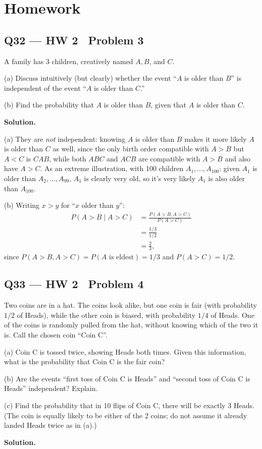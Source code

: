 \documentclass[11pt]{article}
\begin{document}
\section{Homework}

\subsection*{Q32 --- HW 2 \textperiodcentered\ Problem 3}
\begin{qbox}
A family has 3 children, creatively named $A, B$, and $C$.

(a) Discuss intuitively (but clearly) whether the event ``$A$ is older than $B$'' is independent of the event ``$A$ is older than $C$.''

(b) Find the probability that $A$ is older than $B$, given that $A$ is older than $C$.
\end{qbox}
\textbf{Solution.}

(a) They are \emph{not} independent: knowing $A$ is older than $B$ makes it more likely $A$ is older than $C$ as well, since the only birth order compatible with $A>B$ but $A<C$ is $CAB$, while both $ABC$ and $ACB$ are compatible with $A>B$ and also have $A>C$. As an extreme illustration, with 100 children $A_1,\dots,A_{100}$: given $A_1$ is older than $A_2,\dots,A_{99}$, $A_1$ is clearly very old, so it's very likely $A_1$ is also older than $A_{100}$.

(b) Writing $x>y$ for ``$x$ older than $y$'':
\begin{align*}
P(A>B\mid A>C) &= \frac{P(A>B,A>C)}{P(A>C)} \\
&= \frac{1/3}{1/2} \\
&= \frac{2}{3},
\end{align*}
since $P(A>B,A>C) = P(A \text{ is eldest}) = 1/3$ and $P(A>C)=1/2$.

\subsection*{Q33 --- HW 2 \textperiodcentered\ Problem 4}
\begin{qbox}
Two coins are in a hat. The coins look alike, but one coin is fair (with probability $1/2$ of Heads), while the other coin is biased, with probability $1/4$ of Heads. One of the coins is randomly pulled from the hat, without knowing which of the two it is. Call the chosen coin ``Coin C''.

(a) Coin C is tossed twice, showing Heads both times. Given this information, what is the probability that Coin C is the fair coin?

(b) Are the events ``first toss of Coin C is Heads'' and ``second toss of Coin C is Heads'' independent? Explain.

(c) Find the probability that in 10 flips of Coin C, there will be exactly 3 Heads. (The coin is equally likely to be either of the 2 coins; do not assume it already landed Heads twice as in (a).)
\end{qbox}
\textbf{Solution.}
\end{document}
